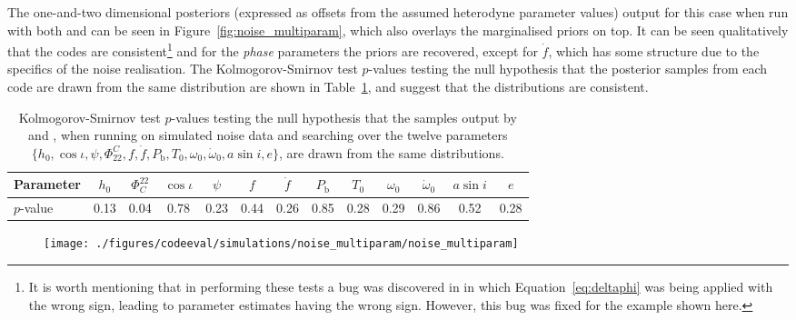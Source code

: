The one-and-two dimensional posteriors (expressed as offsets from the assumed heterodyne parameter values) output for this case when run with both
\lppe and \lppen can be seen in Figure~\ref{fig:noise_multiparam},
which also overlays the marginalised priors on top. It can be seen qualitatively that the codes are consistent\footnote{It is worth mentioning that in performing
these tests a bug was discovered in \lppe in which Equation~\ref{eq:deltaphi} was being applied with the wrong sign, leading to parameter estimates
having the wrong sign. However, this bug was fixed for the example shown here.} and for the {\it phase} parameters the priors are recovered, except for
$\dot{f}$, which has some structure due to the specifics of the noise realisation. The Kolmogorov-Smirnov test $p$-values testing the null hypothesis
that the posterior samples from each code are drawn from the same distribution are shown in Table~\ref{tab:noisemultiks}, and suggest that the
distributions are consistent.

\begin{table}[hptb]
\caption{Kolmogorov-Smirnov test $p$-values testing the null hypothesis that the samples output by \lppen and \lppe, when running on simulated
noise data and searching over the twelve parameters $\{h_0, \cos{\iota}, \psi, \Phi_{22}^C, f,\dot{f},P_{\text{b}}, T_0, \omega_0, \dot{\omega}_0, a\sin{i}, e\}$,
are drawn from the same distributions.\label{tab:noisemultiks}}
\begin{center}
\begin{tabular}{l | c c c c c c c c c c c c}
\hline
Parameter & $h_0$ & $\Phi_C^{22}$ & $\cos{\iota}$ & $\psi$ & $f$ & $\dot{f}$ & $P_{\text{b}}$ & $T_0$ & $\omega_0$ & $\dot{\omega}_0$ & $a\sin{i}$ & $e$ \\                      
\hline
\hline
$p$-value  & 0.13 & 0.04 & 0.78 & 0.23 & 0.44 & 0.26 & 0.85 & 0.28 & 0.29 & 0.86 & 0.52 & 0.28 \\
\hline
\end{tabular}
\end{center}
\end{table}

\begin{figure}[!phtb]
\begin{center}
\texttt{[image: ./figures/codeeval/simulations/noise\_multiparam/noise\_multiparam]}
\caption{ \protect}
\end{center}
\end{figure}

